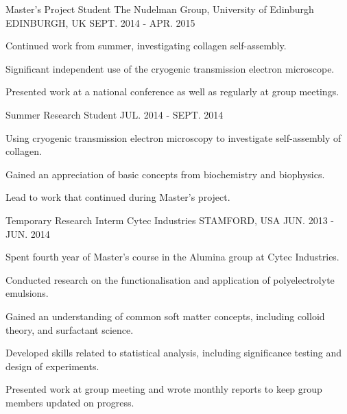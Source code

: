\begin{cventries}
  \cventry
    {Master's Project Student}
    {The Nudelman Group, University of Edinburgh}
    {EDINBURGH, UK}
    {SEPT. 2014 - APR. 2015}
    {
      \begin{cvitems}
        \item {Continued work from summer, investigating collagen self-assembly.}
        \item {Significant independent use of the cryogenic transmission electron microscope.}
        \item {Presented work at a national conference as well as regularly at group meetings.}
      \end{cvitems}
    }
  \cventry
    {Summer Research Student}
	{}
    {}
    {JUL. 2014 - SEPT. 2014}
    {
      \begin{cvitems}
        \item {Using cryogenic transmission electron microscopy to investigate self-assembly of collagen.}
        \item {Gained an appreciation of basic concepts from biochemistry and biophysics.}
        \item {Lead to work that continued during Master's project.}
      \end{cvitems}
    }
  \cventry
    {Temporary Research Interm}
    {Cytec Industries}
    {STAMFORD, USA}
    {JUN. 2013 - JUN. 2014}
    {
      \begin{cvitems}
        \item {Spent fourth year of Master's course in the Alumina group at Cytec Industries.}
        \item {Conducted research on the functionalisation and application of polyelectrolyte emulsions.}
        \item {Gained an understanding of common soft matter concepts, including colloid theory, and surfactant science.}
        \item {Developed skills related to statistical analysis, including significance testing and design of experiments.}
		\item {Presented work at group meeting and wrote monthly reports to keep group members updated on progress.}
      \end{cvitems}
    }
\end{cventries}

